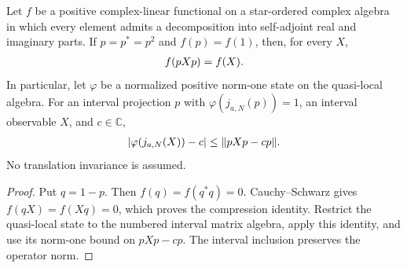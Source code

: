 \begin{lemma}
    \label{thm:positive_functional_support_compression}
    \leanok
    Let $f$ be a positive complex-linear functional on a star-ordered
    complex algebra in which every element admits a decomposition into
    self-adjoint real and imaginary parts. If $p=p^*=p^2$ and $f(p)=f(1)$,
    then, for every $X$,
    \begin{align}
        f(pXp)=f(X).
        \notag
    \end{align}
    In particular, let $\varphi$ be a normalized positive norm-one state
    on the quasi-local algebra. For an interval projection $p$ with
    $\varphi(j_{a,N}(p))=1$, an interval observable $X$, and $c\in\mathbb C$,
    \begin{align}
        |\varphi(j_{a,N}(X))-c|\leq\|pXp-cp\|.
        \notag
    \end{align}
    No translation invariance is assumed.
\end{lemma}
\begin{proof}\leanok
    Put $q=1-p$. Then $f(q)=f(q^*q)=0$. Cauchy--Schwarz gives
    $f(qX)=f(Xq)=0$, which proves the compression identity.
    Restrict the quasi-local state to the numbered interval matrix algebra,
    apply this identity, and use its norm-one bound on $pXp-cp$.
    The interval inclusion preserves the operator norm.
\end{proof}

